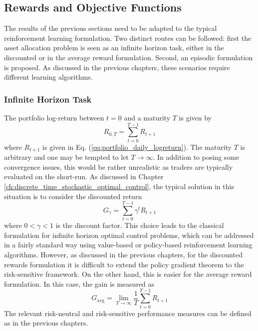 \subsection{Rewards and Objective Functions}
The results of the previous sections need to be adapted to the typical reinforcement learning formulation. Two distinct routes can be followed: first the asset allocation problem is seen as an infinite horizon task, either in the discounted or in the average reward formulation. Second, an episodic formulation is proposed. As discussed in the previous chapters, these scenarios require different learning algorithms. 

\subsubsection{Infinite Horizon Task}
The portfolio log-return between $t=0$ and a maturity $T$ is given by
\begin{equation*}
	R_{0,T} = \sum_{t=0}^{T-1} R_{t+1}
\end{equation*}
where $R_{t+1}$ is given in Eq. (\ref{eq:portfolio_daily_logreturn}). The maturity $T$ is arbitrary and one may be tempted to let $T \to \infty$. In addition to posing some convergence issues, this would be rather unrealistic as traders are typically evaluated on the short-run. As discussed in Chapter \ref{ch:discrete_time_stochastic_optimal_control}, the typical solution in this situation is to consider the discounted return
\begin{equation*}
	G_\gamma = \sum_{t=0}^{T-1} \gamma^t R_{t+1}
\end{equation*}
where $0 < \gamma < 1$ is the discount factor. This choice leads to the classical formulation for infinite horizon optimal control problems, which can be addressed in a fairly standard way using value-based or policy-based reinforcement learning algorithms. However, as discussed in the previous chapters, for the discounted rewards formulation it is difficult to extend the policy gradient theorem to the risk-sensitive framework. On the other hand, this is easier for the average reward formulation. In this case, the gain is measured as 
\begin{equation*}
	G_\text{avg} = \lim_{T\to\infty} \frac{1}{T} \sum_{t=0}^{T-1} R_{t+1} 
\end{equation*} 
The relevant risk-neutral and risk-sensitive performance measures can be defined as in the previous chapters.

